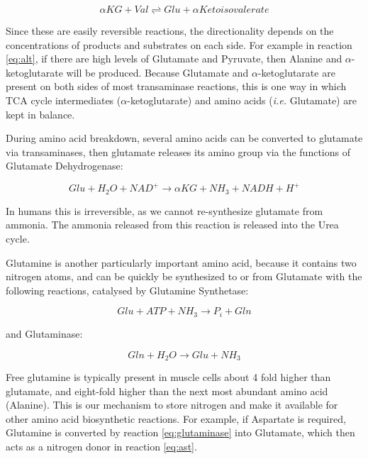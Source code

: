 \documentclass{tufte-handout}
\begin{document}
 \begin{equation}
\alpha KG + Val \rightleftharpoons Glu +\alpha Ketoisovalerate
\end{equation}

Since these are easily reversible reactions, the directionality depends on the concentrations of products and substrates on each side.  For example in reaction \ref{eq:alt}, if there are high levels of Glutamate and Pyruvate, then  Alanine and $\alpha$-ketoglutarate will be produced.  Because Glutamate and $\alpha$-ketoglutarate are present on both sides of most transaminase reactions, this is one way in which TCA cycle intermediates ($\alpha$-ketoglutarate) and amino acids (\textit{i.e.} Glutamate) are kept in balance.

  During amino acid breakdown, several amino acids can be converted to glutamate via transaminases, then glutamate releases its amino group via the functions of Glutamate Dehydrogenase:

\begin{equation}\label{eq:GDH}
Glu + H_2O + NAD^+  \rightarrow  \alpha KG + NH_3 + NADH + H^+
\end{equation}

In humans this is irreversible, as we cannot re-synthesize glutamate from ammonia.  The ammonia released from this reaction is released into the Urea cycle.

  Glutamine is another particularly important amino acid, because it contains two nitrogen atoms, and can be quickly be synthesized to or from Glutamate with the following reactions, catalysed by Glutamine Synthetase:

\begin{equation}
Glu + ATP +  NH_3 \rightarrow  P_i + Gln
\end{equation}

and Glutaminase:

\begin{equation}\label{eq:glutaminase} 
Gln + H_2O \rightarrow Glu + NH_3
\end{equation}

Free glutamine is typically present in muscle cells about 4 fold higher than glutamate, and eight-fold higher than the next most abundant amino acid (Alanine).  This is our mechanism to store nitrogen and make it available for other amino acid biosynthetic reactions.  For example, if Aspartate is required, Glutamine is converted by reaction \ref{eq:glutaminase} into Glutamate, which then acts as a nitrogen donor in reaction \ref{eq:ast}.
\end{document}
